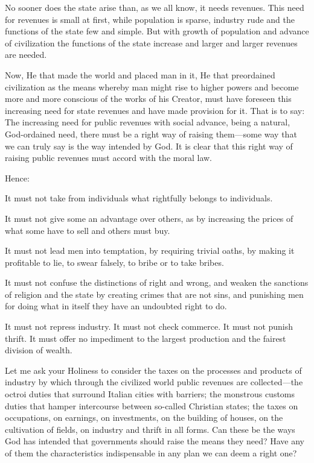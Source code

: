 \documentclass{book}
\begin{document}
No sooner does the state arise than, as we all know, it needs revenues. This need for revenues is small at first, while population is sparse, industry rude and the functions of the state few and simple. But with growth of population and advance of civilization the functions of the state increase and larger and larger revenues are needed.

Now, He that made the world and placed man in it, He that preordained civilization as the means whereby man might rise to higher powers and become more and more conscious of the works of his Creator, must have foreseen this increasing need for state revenues and have made provision for it. That is to say: The increasing need for public revenues with social advance, being a natural, God-ordained need, there must be a right way of raising them—some way that we can truly say is the way intended by God. It is clear that this right way of raising public revenues must accord with the moral law.

Hence:

It must not take from individuals what rightfully belongs to individuals.

It must not give some an advantage over others, as by increasing the prices of what some have to sell and others must buy.

It must not lead men into temptation, by requiring trivial oaths, by making it profitable to lie, to swear falsely, to bribe or to take bribes.

It must not confuse the distinctions of right and wrong, and weaken the sanctions of religion and the state by creating crimes that are not sins, and punishing men for doing what in itself they have an undoubted right to do.

It must not repress industry. It must not check commerce. It must not punish thrift. It must offer no impediment to the largest production and the fairest division of wealth.

Let me ask your Holiness to consider the taxes on the processes and products of industry by which through the civilized world public revenues are collected—the octroi duties that surround Italian cities with barriers; the monstrous customs duties that hamper intercourse between so-called Christian states; the taxes on occupations, on earnings, on investments, on the building of houses, on the cultivation of fields, on industry and thrift in all forms. Can these be the ways God has intended that governments should raise the means they need? Have any of them the characteristics indispensable in any plan we can deem a right one?
\end{document}
